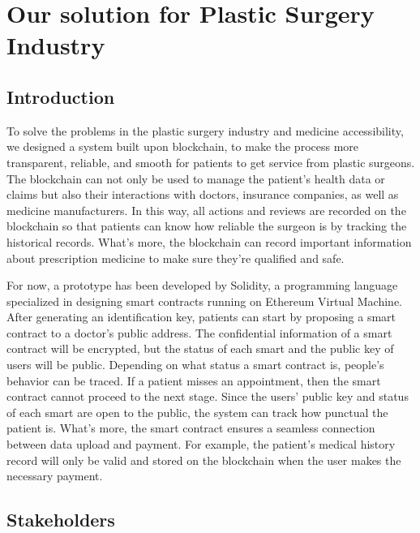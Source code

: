 \documentclass{article}
\begin{document}
\section{Our solution for Plastic Surgery Industry}
\subsection{Introduction}
To solve the problems in the plastic surgery industry and medicine accessibility, we designed a system built upon blockchain, to make the process more transparent, reliable, and smooth for patients to get service from plastic surgeons. The blockchain can not only be used to manage the patient's health data or claims but also their interactions with doctors, insurance companies, as well as medicine manufacturers. In this way, all actions and reviews are recorded on the blockchain so that patients can know how reliable the surgeon is by tracking the historical records. What's more, the blockchain can record important information about prescription medicine to make sure they're qualified and safe.
\par For now, a prototype has been developed by Solidity, a programming language specialized in designing smart contracts running on Ethereum Virtual Machine. After generating an identification key, patients can start by proposing a smart contract to a doctor's public address. The confidential information of a smart contract will be encrypted, but the status of each smart and the public key of users will be public. Depending on what status a smart contract is, people's behavior can be traced. If a patient misses an appointment, then the smart contract cannot proceed to the next stage. Since the users' public key and status of each smart are open to the public, the system can track how punctual the patient is. What's more, the smart contract ensures a seamless connection between data upload and payment. For example, the patient's medical history record will only be valid and stored on the blockchain when the user makes the necessary payment.
\subsection{Stakeholders}
\end{document}
